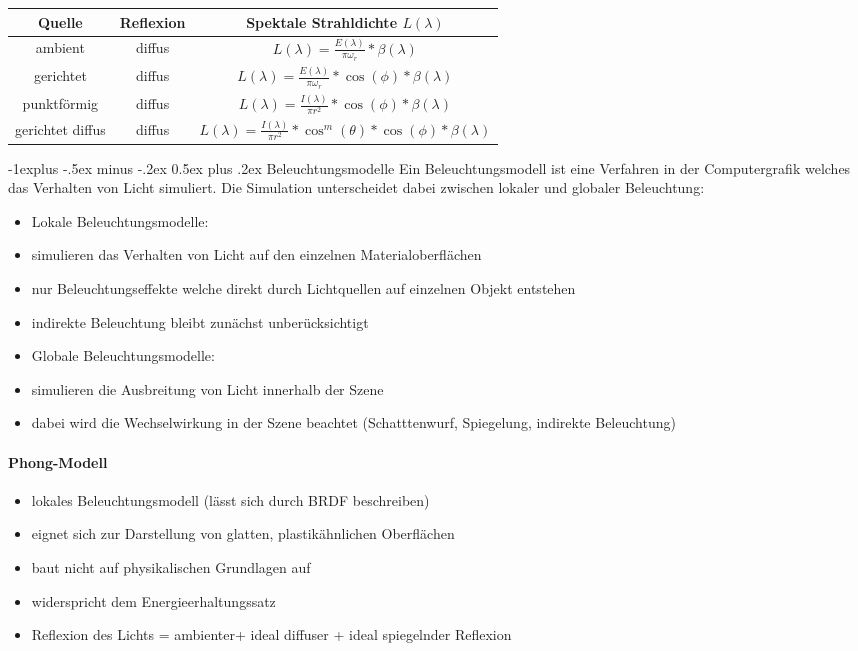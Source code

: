 \documentclass[10pt,landscape]{article}
\makeatletter
\renewcommand{\subsection}{\@startsection{subsection}{2}{0mm}%
                                {-1explus -.5ex minus -.2ex}%
                                {0.5ex plus .2ex}%
                                {\normalfont\normalsize\bfseries}}
\makeatother
\begin{document}
\begin{multicols}{3}
\begin{tabular}{c | c | c}
  Quelle           & Reflexion & Spektale Strahldichte $L(\lambda)$                                                 \\\hline
  ambient          & diffus    & $L(\lambda)=\frac{E(\lambda)}{\pi\omega_r}*\beta(\lambda)$                         \\
  gerichtet        & diffus    & $L(\lambda)=\frac{E(\lambda)}{\pi\omega_r}*\cos(\phi)*\beta(\lambda)$              \\
  punktförmig      & diffus    & $L(\lambda) = \frac{I(\lambda)}{\pi r^2 }*\cos(\phi)*\beta(\lambda)$               \\
  gerichtet diffus & diffus    & $L(\lambda)=\frac{I(\lambda)}{\pi r^2 }* \cos^m(\theta)*\cos(\phi)*\beta(\lambda)$ \\
\end{tabular}

\subsection{ Beleuchtungsmodelle}
Ein Beleuchtungsmodell ist eine Verfahren in der Computergrafik welches das Verhalten von Licht simuliert. Die Simulation unterscheidet dabei zwischen lokaler und globaler Beleuchtung:
\begin{itemize}
  \item Lokale Beleuchtungsmodelle:
  \item simulieren das Verhalten von Licht auf den einzelnen Materialoberflächen
  \item nur Beleuchtungseffekte welche direkt durch Lichtquellen auf einzelnen Objekt entstehen
  \item indirekte Beleuchtung bleibt zunächst unberücksichtigt
  \item Globale Beleuchtungsmodelle:
  \item simulieren die Ausbreitung von Licht innerhalb der Szene
  \item dabei wird die Wechselwirkung in der Szene beachtet (Schatttenwurf, Spiegelung, indirekte Beleuchtung)
\end{itemize}

\paragraph{Phong-Modell}
\begin{itemize}
  \item lokales Beleuchtungsmodell (lässt sich durch BRDF beschreiben)
  \item eignet sich zur Darstellung von glatten, plastikähnlichen Oberflächen
  \item baut nicht auf physikalischen Grundlagen auf
  \item widerspricht dem Energieerhaltungssatz
  \item Reflexion des Lichts = ambienter+ ideal diffuser + ideal spiegelnder Reflexion
\end{itemize}


\end{multicols}
\end{document}
